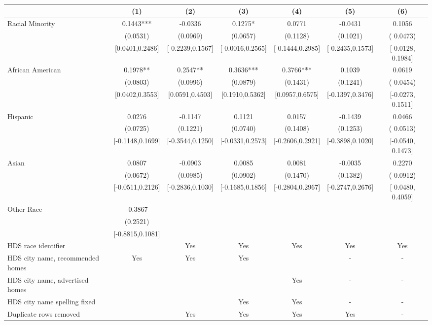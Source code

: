 \begin{table}[htbp]
{\begin{tabular}{l*{6}{c}}
                    \cmidrule(lr){2-2}\cmidrule(lr){3-3}\cmidrule(lr){4-4}\cmidrule(lr){5-5}\cmidrule(lr){6-6}\cmidrule(lr){7-7}
                    &\multicolumn{1}{c}{(1)}   &\multicolumn{1}{c}{(2)}   &\multicolumn{1}{c}{(3)}   &\multicolumn{1}{c}{(4)}   &\multicolumn{1}{c}{(5)}   &\multicolumn{1}{c}{(6)}\\
\midrule
Racial Minority & 0.1443*** & -0.0336 & 0.1275* & 0.0771 & -0.0431 & 0.1056\sym{**} \\
 & (0.0531) & (0.0969) & (0.0657) & (0.1128) & (0.1021) & ( 0.0473) \\
 & [0.0401,0.2486] & [-0.2239,0.1567] & [-0.0016,0.2565] & [-0.1444,0.2985] & [-0.2435,0.1573] & [ 0.0128,  0.1984] \\
\midrule
African American & 0.1978** & 0.2547** & 0.3636*** & 0.3766*** & 0.1039 & 0.0619 \\
 & (0.0803) & (0.0996) & (0.0879) & (0.1431) & (0.1241) & ( 0.0454) \\
 & [0.0402,0.3553] & [0.0591,0.4503] & [0.1910,0.5362] & [0.0957,0.6575] & [-0.1397,0.3476] & [-0.0273,  0.1511] \\
Hispanic & 0.0276 & -0.1147 & 0.1121 & 0.0157 & -0.1439 & 0.0466 \\
 & (0.0725) & (0.1221) & (0.0740) & (0.1408) & (0.1253) & ( 0.0513) \\
 & [-0.1148,0.1699] & [-0.3544,0.1250] & [-0.0331,0.2573] & [-0.2606,0.2921] & [-0.3898,0.1020] & [-0.0540,  0.1473] \\
Asian & 0.0807 & -0.0903 & 0.0085 & 0.0081 & -0.0035 & 0.2270\sym{**} \\
 & (0.0672) & (0.0985) & (0.0902) & (0.1470) & (0.1382) & ( 0.0912) \\
 & [-0.0511,0.2126] & [-0.2836,0.1030] & [-0.1685,0.1856] & [-0.2804,0.2967] & [-0.2747,0.2676] & [ 0.0480,  0.4059] \\
Other Race & -0.3867 &  &  &  &  &  \\
 & (0.2521) &  &  &  &  &  \\
 & [-0.8815,0.1081] &  &  &  &  &  \\
\midrule
HDS race identifier & & Yes & Yes & Yes & Yes & Yes \\
HDS city name, recommended homes & Yes & Yes & Yes & & - & -\\
HDS city name, advertised homes &  &  &  & Yes & - & -\\
HDS city name spelling fixed & & & Yes & Yes & - & -\\
Duplicate rows removed &  & Yes & Yes & Yes & Yes & - \\

\end{tabular}}
\end{table}
